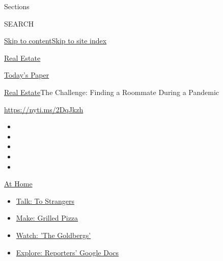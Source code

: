 Sections

SEARCH

\protect\hyperlink{site-content}{Skip to
content}\protect\hyperlink{site-index}{Skip to site index}

\href{https://www.nytimes3xbfgragh.onion/section/realestate}{Real
Estate}

\href{https://myaccount.nytimes3xbfgragh.onion/auth/login?response_type=cookie\&client_id=vi}{}

\href{https://www.nytimes3xbfgragh.onion/section/todayspaper}{Today's
Paper}

\href{/section/realestate}{Real Estate}\textbar{}The Challenge: Finding
a Roommate During a Pandemic

\url{https://nyti.ms/2DqJkzh}

\begin{itemize}
\item
\item
\item
\item
\item
\end{itemize}

\href{https://www.nytimes3xbfgragh.onion/spotlight/at-home?action=click\&pgtype=Article\&state=default\&region=TOP_BANNER\&context=at_home_menu}{At
Home}

\begin{itemize}
\tightlist
\item
  \href{https://www.nytimes3xbfgragh.onion/2020/08/03/well/family/the-benefits-of-talking-to-strangers.html?action=click\&pgtype=Article\&state=default\&region=TOP_BANNER\&context=at_home_menu}{Talk:
  To Strangers}
\item
  \href{https://www.nytimes3xbfgragh.onion/2020/08/01/at-home/coronavirus-make-pizza-on-a-grill.html?action=click\&pgtype=Article\&state=default\&region=TOP_BANNER\&context=at_home_menu}{Make:
  Grilled Pizza}
\item
  \href{https://www.nytimes3xbfgragh.onion/2020/07/31/arts/television/goldbergs-abc-stream.html?action=click\&pgtype=Article\&state=default\&region=TOP_BANNER\&context=at_home_menu}{Watch:
  'The Goldbergs'}
\item
  \href{https://www.nytimes3xbfgragh.onion/interactive/2020/at-home/even-more-reporters-editors-diaries-lists-recommendations.html?action=click\&pgtype=Article\&state=default\&region=TOP_BANNER\&context=at_home_menu}{Explore:
  Reporters' Google Docs}
\end{itemize}

